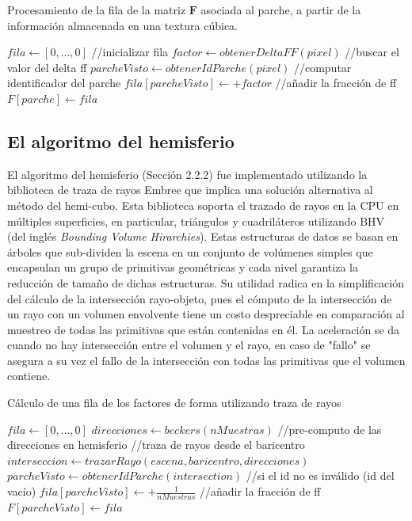 \begin{algorithm}
\caption{Procesamiento de la fila de la matriz $\mathbf{F}$ asociada al parche, a partir de la información almacenada en una textura cúbica.}
\label{alg:processHemicube}
	\fontsize{8}{8}\selectfont
\begin{algorithmic}
			\State $fila \gets [0,...,0]$ //inicializar fila
				\State $factor \gets obtenerDeltaFF(pixel)$ //buscar el valor del delta ff
				\State $parcheVisto \gets obtenerIdParche(pixel)$ //computar identificador del parche
					\State $fila[parcheVisto] \gets + factor$ //añadir la fracción de ff
				\EndIf
			\EndLoop
			\State $F[parche] \gets  fila$
		\EndFunction
\end{algorithmic}
\end{algorithm}

\subsection{El algoritmo del hemisferio}
El algoritmo del hemisferio (Sección 2.2.2) fue implementado utilizando la biblioteca de traza de rayos Embree que implica una solución alternativa al método del hemi-cubo. Esta biblioteca soporta el trazado de rayos en la CPU en múltiples superficies, en particular, triángulos y cuadriláteros utilizando BHV (del inglés \textit{Bounding Volume Hirarchies}). Estas estructuras de datos se basan en árboles que sub-dividen la escena en un conjunto de volúmenes simples que encapsulan un grupo de primitivas geométricas y cada nivel garantiza la reducción de tamaño de dichas estructuras. Su utilidad radica en la simplificación del cálculo de la intersección rayo-objeto, pues el cómputo de la intersección de un rayo con un volumen envolvente tiene un costo despreciable en comparación al muestreo de todas las primitivas que están contenidas en él. La aceleración se da cuando no hay intersección entre el volumen y el rayo, en caso de "fallo" se asegura a su vez el fallo de la intersección con todas las primitivas que el volumen contiene.

\begin{algorithm}
	\caption{Cálculo de una fila de los factores de forma utilizando traza de rayos}
	\label{alg:computeff}
	\fontsize{8}{8}\selectfont
	\begin{algorithmic}
			\State $fila \gets [0,...,0]$
			\State $direcciones \gets beckers(nMuestras)$ //pre-computo de las direcciones en hemisferio
			//traza de rayos desde el baricentro
			\State $interseccion \gets trazarRayo(escena, baricentro, direcciones)$ 
			\State $parcheVisto \gets obtenerIdParche(intersection)$
			//si el id no es inválido (id del vacío)
			\State $fila[parcheVisto] \gets + \frac{1}{nMuestras}$ //añadir la fracción de ff
			\EndIf
			\EndLoop
			\State $F[parcheVisto] \gets  fila$
		\EndFunction
	\end{algorithmic}
\end{algorithm}

